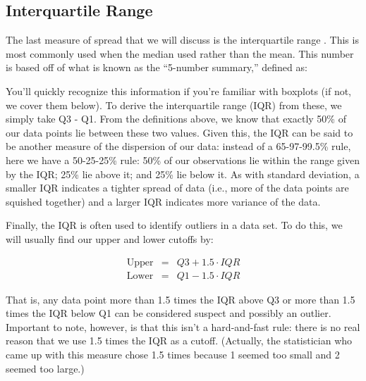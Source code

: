 \subsection{Interquartile Range}
The last measure of spread that we will discuss is the interquartile range . This is most commonly used when the median used rather than the mean. This number is based off of what is known as the ``5-number summary,'' defined as:

\begin{glossary}
\term{}{}
\end{glossary}

You'll quickly recognize this information if you're familiar with boxplots (if not, we cover them below). To derive the interquartile range (IQR) from these, we simply take Q3 - Q1. From the definitions above, we know that exactly 50\% of our data points lie between these two values. Given this, the IQR can be said to be another measure of the dispersion of our data: instead of a 65-97-99.5\% rule, here we have a 50-25-25\% rule: 50\% of our observations lie within the range given by the IQR; 25\% lie above it; and 25\% lie below it. As with standard deviation, a smaller IQR indicates a tighter spread of data (i.e., more of the data points are squished together) and a larger IQR indicates more variance of the data.

Finally, the IQR is often used to identify outliers in a data set. To do this, we will usually find our upper and lower cutoffs by:

\begin{eqnarray*}
    \text{Upper} &=& Q3+1.5\cdot IQR \\
    \text{Lower} &=& Q1-1.5\cdot IQR
\end{eqnarray*}

That is, any data point more than 1.5 times the IQR above Q3 or more than 1.5 times the IQR below Q1 can be considered suspect and possibly an outlier. Important to note, however, is that this isn't a hard-and-fast rule: there is no real reason that we use 1.5 times the IQR as a cutoff. (Actually, the statistician who came up with this measure chose 1.5 times because 1 seemed too small and 2 seemed too large.)

